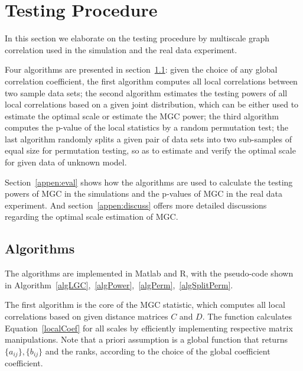 \documentclass[11pt]{article}
\begin{document}

\section{Testing Procedure}
\label{appen:tests}

In this section we elaborate on the testing procedure by multiscale graph correlation used in the simulation and the real data experiment. 

Four algorithms are presented in section~\ref{appen:algorithms}: given the choice of any global correlation coefficient, the first algorithm computes all local correlations between two sample data sets; the second algorithm estimates the testing powers of all local correlations based on a given joint distribution, which can be either used to estimate the optimal scale or estimate the MGC power; the third algorithm computes the p-value of the local statistics by a random permutation test; the last algorithm randomly splits a given pair of data sets into two sub-samples of equal size for permutation testing, so as to estimate and verify the optimal scale for given data of unknown model. 

Section~\ref{appen:eval} shows how the algorithms are used to calculate the testing powers of MGC in the simulations and the p-values of MGC in the real data experiment. And section~\ref{appen:discuss} offers more detailed discussions regarding the optimal scale estimation of MGC.

\subsection{Algorithms}
\label{appen:algorithms}
The algorithms are implemented in Matlab and R, with the pseudo-code shown in Algorithm~\ref{algLGC},~\ref{algPower},~\ref{algPerm},~\ref{algSplitPerm}.

The first algorithm is the core of the MGC statistic, which computes all local correlations based on given distance matrices $C$ and $D$. The function calculates Equation~\ref{localCoef} for all scales by efficiently implementing respective matrix manipulations. Note that a priori assumption is a global function that returns $\{a_{ij}\},\{b_{ij}\}$ and the ranks, according to the choice of the global coefficient coefficient.
\end{document}
